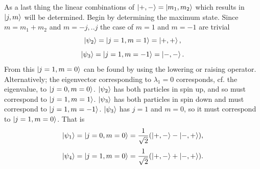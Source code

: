 \begin{example}
\begin{enumerate}
		As a last thing the linear combinations of $\ket{+,-}=\ket{m_1,m_2}$ which results in $\ket{j,m}$ will be determined. Begin by determining the maximum state. Since $m=m_1+m_2$ and $m=-j,..j$ the case of $m=1$ and $m=-1$ are trivial
		\begin{equation}
			\ket{\psi_2}=\ket{j=1,m=1}=\ket{+,+},
		\end{equation} 
		\begin{equation}
			\ket{\psi_3}=\ket{j=1,m=-1}=\ket{-,-}.
		\end{equation} 
		From this $\ket{j=1,m=0}$ can be found by using the lowering or raising operator. Alternatively; the eigenvector corresponding to $\lambda_1=0$ corresponds, cf. the eigenvalue, to $\ket{j=0,m=0}$. $\ket{\psi_2}$ has both particles in spin up, and so must correspond to $\ket{j=1,m=1}$. $\ket{\psi_3}$ has both particles in spin down and must correspond to $\ket{j=1,m=-1}$. $\ket{\psi_3}$ has $j=1$ and $m=0$, so it must correspond to $\ket{j=1,m=0}$. That is
		\begin{equation}
			\ket{\psi_1}=\ket{j=0,m=0}=\frac{1}{\sqrt{2}}(\ket{+,-}-\ket{-,+}),
		\end{equation} 
		\begin{equation}
			\ket{\psi_4}=\ket{j=1,m=0}=\frac{1}{\sqrt{2}}(\ket{+,-}+\ket{-,+}).
		\end{equation} 
	\end{enumerate}
\end{example}

